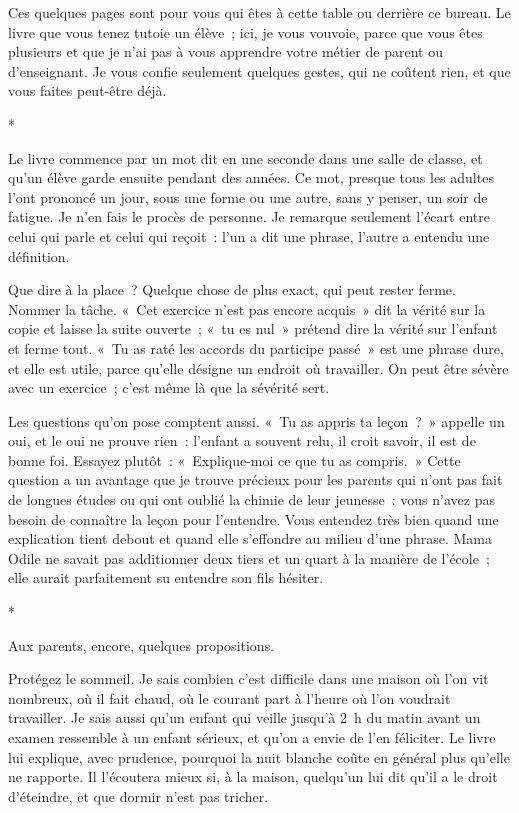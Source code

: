 \documentclass[10.5pt,twoside,openright]{book}
\newcommand{\asterisme}{\par\vspace{0.7em}\centerline{\color{gris}*\quad*\quad*}\vspace{0.7em}\par\noindent}
\begin{document}
Ces quelques pages sont pour vous qui êtes à cette table ou derrière ce bureau. Le livre que vous tenez tutoie un élève ; ici, je vous vouvoie, parce que vous êtes plusieurs et que je n’ai pas à vous apprendre votre métier de parent ou d’enseignant. Je vous confie seulement quelques gestes, qui ne coûtent rien, et que vous faites peut-être déjà.

\asterisme

Le livre commence par un mot dit en une seconde dans une salle de classe, et qu’un élève garde ensuite pendant des années. Ce mot, presque tous les adultes l’ont prononcé un jour, sous une forme ou une autre, sans y penser, un soir de fatigue. Je n’en fais le procès de personne. Je remarque seulement l’écart entre celui qui parle et celui qui reçoit : l’un a dit une phrase, l’autre a entendu une définition.

Que dire à la place ? Quelque chose de plus exact, qui peut rester ferme. Nommer la tâche. « Cet exercice n’est pas encore acquis » dit la vérité sur la copie et laisse la suite ouverte ; « tu es nul » prétend dire la vérité sur l’enfant et ferme tout. « Tu as raté les accords du participe passé » est une phrase dure, et elle est utile, parce qu’elle désigne un endroit où travailler. On peut être sévère avec un exercice ; c’est même là que la sévérité sert.

Les questions qu’on pose comptent aussi. « Tu as appris ta leçon ? » appelle un oui, et le oui ne prouve rien : l’enfant a souvent relu, il croit savoir, il est de bonne foi. Essayez plutôt : « Explique-moi ce que tu as compris. » Cette question a un avantage que je trouve précieux pour les parents qui n’ont pas fait de longues études ou qui ont oublié la chimie de leur jeunesse : vous n’avez pas besoin de connaître la leçon pour l’entendre. Vous entendez très bien quand une explication tient debout et quand elle s’effondre au milieu d’une phrase. Mama Odile ne savait pas additionner deux tiers et un quart à la manière de l’école ; elle aurait parfaitement su entendre son fils hésiter.

\asterisme

Aux parents, encore, quelques propositions.

Protégez le sommeil. Je sais combien c’est difficile dans une maison où l’on vit nombreux, où il fait chaud, où le courant part à l’heure où l’on voudrait travailler. Je sais aussi qu’un enfant qui veille jusqu’à 2 h du matin avant un examen ressemble à un enfant sérieux, et qu’on a envie de l’en féliciter. Le livre lui explique, avec prudence, pourquoi la nuit blanche coûte en général plus qu’elle ne rapporte. Il l’écoutera mieux si, à la maison, quelqu’un lui dit qu’il a le droit d’éteindre, et que dormir n’est pas tricher.
\end{document}
